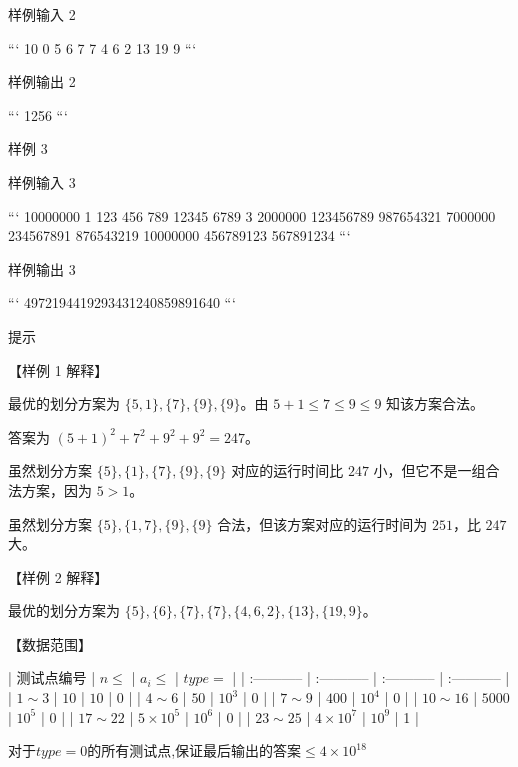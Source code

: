 \documentclass[12pt,twiside,a4paper]{ctexbook}
\numberwithin{chapter}{part}
\begin{document}
 样例输入 2

```
10 0
5 6 7 7 4 6 2 13 19 9
```

 样例输出 2

```
1256
```

 样例 3

 样例输入 3

```
10000000 1
123 456 789 12345 6789 3
2000000 123456789 987654321
7000000 234567891 876543219
10000000 456789123 567891234
```

 样例输出 3

```
4972194419293431240859891640
```

 提示

【样例 1 解释】

最优的划分方案为 $\{5,1\}, \{7\}, \{9\}, \{9\}$。由 $5 + 1 \leq 7 \leq 9 \leq 9$ 知该方案合法。

答案为 $(5 + 1)^2 + 7^2 + 9^2 + 9^2 = 247$。

虽然划分方案 $\{5\}, \{1\}, \{7\}, \{9\}, \{9\}$ 对应的运行时间比 $247$ 小，但它不是一组合法方案，因为 $5 > 1$。

虽然划分方案 $\{5\}, \{1,7\}, \{9\}, \{9\}$ 合法，但该方案对应的运行时间为 $251$，比 $247$ 大。

【样例 2 解释】

最优的划分方案为 $\{5\}, \{6\}, \{7\}, \{7\}, \{4,6,2\}, \{13\}, \{19,9\}$。

【数据范围】

| 测试点编号 | $n \leq$ | $a_i \leq$ | $type =$ |
| :----------- | :----------- | :----------- | :----------- |
| $1 \sim 3$ | $10$ | $10$ | 0 |
| $4 \sim 6$ | $50$ | $10^3$ | 0 |
| $7 \sim 9$ | $400$ | $10^4$ | 0 |
| $10 \sim 16$ | $5000$ | $10^5$ | 0 |
| $17 \sim 22$ | $5 \times 10^5$ | $10^6$ | 0 |
| $23 \sim 25$ | $4 \times 10^7$ | $10^9$ | 1 |

对于$type=0$的所有测试点,保证最后输出的答案$\leq 4 \times 10^{18}$
\end{document}
